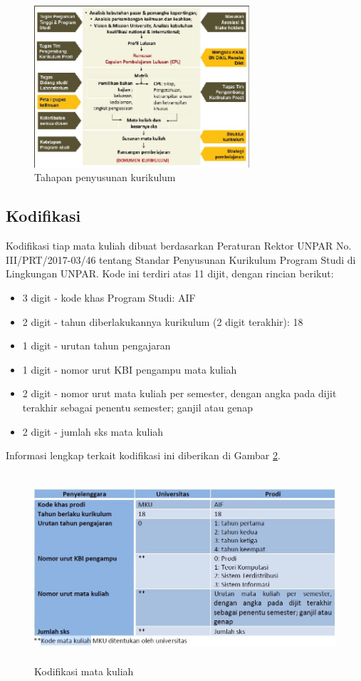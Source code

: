 \begin{figure}[H]
    \centering
    \includegraphics[height=6cm]{Gambar/Penyusunan Kurikulum.jpg}
    \caption{Tahapan penyusunan kurikulum}
    \label{fig:gambar1}
\end{figure}

\subsection{Kodifikasi}
Kodifikasi tiap mata kuliah dibuat berdasarkan Peraturan Rektor UNPAR No. III/PRT/2017-03/46 tentang Standar Penyusunan Kurikulum Program Studi di Lingkungan UNPAR. Kode ini terdiri atas 11 dijit, dengan rincian berikut:

\begin{itemize}
    \item 3 digit - kode khas Program Studi: AIF
    \item 2 digit - tahun diberlakukannya kurikulum (2 digit terakhir): 18
    \item 1 digit - urutan tahun pengajaran
    \item 1 digit - nomor urut KBI pengampu mata kuliah
    \item 2 digit - nomor urut mata kuliah per semester, dengan angka pada dijit terakhir sebagai penentu semester; ganjil atau genap
    \item 2 digit - jumlah sks mata kuliah
\end{itemize}

Informasi lengkap terkait kodifikasi ini diberikan di Gambar \ref{fig:gambar2}.

\begin{figure}[H]
    \centering
    \includegraphics[width=14cm, height=7cm]{Gambar/Kode mata kuliah.jpg}
    \caption{Kodifikasi mata kuliah}
    \label{fig:gambar2}
\end{figure}

